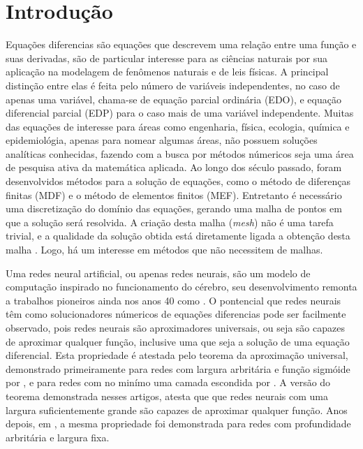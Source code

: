 \chapter{Introdução}
\label{sec-intro}

Equações diferencias são equações que descrevem uma relação entre uma função
e suas derivadas, são de particular interesse para as ciências naturais
por sua aplicação na modelagem de fenômenos naturais e de leis físicas.
A principal distinção entre elas é feita pelo número de variáveis independentes,
no caso de apenas uma variável, chama-se de equação parcial ordinária (EDO),
e equação diferencial parcial (EDP) para o caso mais de uma variável independente.
Muitas das equações de interesse para áreas como engenharia, física, 
ecologia, química e epidemiológia, apenas para nomear algumas áreas, 
não possuem soluções analíticas conhecidas, fazendo com a busca por métodos 
númericos seja uma área de pesquisa ativa da matemática aplicada. 
Ao longo dos século passado, foram desenvolvidos métodos para a solução de 
equações, como o método de diferenças finitas (MDF) e o 
método de elementos finitos (MEF).
Entretanto é necessário uma discretização do domínio das equações, gerando uma 
malha de pontos em que a solução será resolvida.
A criação desta malha (\textit{mesh}) não é uma tarefa trivial, e a qualidade 
da solução obtida está diretamente ligada a obtenção desta malha \cite{raissi-etal:19}.
Logo, há um interesse em métodos que não necessitem de malhas. 

Uma redes neural artificial, ou apenas redes neurais, são um modelo de computação 
inspirado no funcionamento do cérebro, seu desenvolvimento remonta a trabalhos
pioneiros ainda nos anos 40 como \cite{mcculloch-pitts:1943-perceptron}.
O pontencial que redes neurais têm como solucionadores númericos de equações
diferencias pode ser facilmente observado, pois redes neurais são aproximadores
universais, ou seja são capazes de aproximar qualquer função, inclusive uma 
que seja a solução de uma equação diferencial.
Esta propriedade é atestada pelo teorema da aproximação universal, 
demonstrado primeiramente para redes com
largura arbritária e função sigmóide por \cite{cybenko:89}, e para redes 
com no minímo uma camada escondida por \cite{hornik:89-aprox-universais}. 
A versão do teorema demonstrada nesses artigos, atesta que
que redes neurais com uma largura suficientemente grande são capazes de aproximar 
qualquer função. Anos depois, em \cite{grippen:03-aprox-universais-profundidade},
a mesma propriedade foi demonstrada para redes com profundidade arbritária 
e largura fixa.


